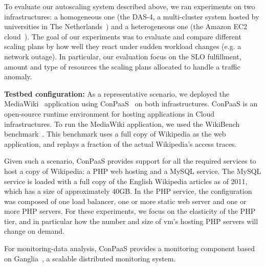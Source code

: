 To evaluate our autoscaling system described above, we ran experiments
on two infrastructures: a homogeneous one (the DAS-4, a multi-cluster system
hosted by universities in The Netherlands~\cite{das4}) and a heterogeneous
one (the Amazon EC2 cloud~\cite{amazonEC2}). The goal of our experiments
was to evaluate and compare different scaling plans by how well they react under sudden
workload changes (e.g. a network outage). In particular, our evaluation focus on
the SLO fulfillment, amount and type of resources the scaling plans allocated to handle
a traffic anomaly. 



\textbf{Testbed configuration:}  As a representative scenario, we deployed the MediaWiki~\cite{mediawiki} application using ConPaaS~\cite{conpaasIC} on both infrastructures. ConPaaS is an open-source runtime environment for hosting applications in Cloud infrastructures. To run the MediaWiki application, we used the WikiBench benchmark~\cite{wikibench}. This benchmark uses a full copy of Wikipedia as the web application, and replays a fraction of the actual Wikipedia's access traces. 

Given such a scenario, ConPaaS provides support for all the required services to host a copy of Wikipedia: a PHP web hosting and a MySQL service. The MySQL service is loaded with a full copy of the English Wikipedia articles as of 2011, which has a size of approximately 40GB.  In the PHP service, the configuration was composed of one load balancer, one or more static web server and one or more PHP servers. For these experiments, we focus on the elasticity of the PHP tier, and in particular how the number and size of vm's hosting PHP servers will change on demand.

For monitoring-data analysis, ConPaaS provides a monitoring component based on Ganglia~\cite{ganglia}, a scalable distributed monitoring system. 


